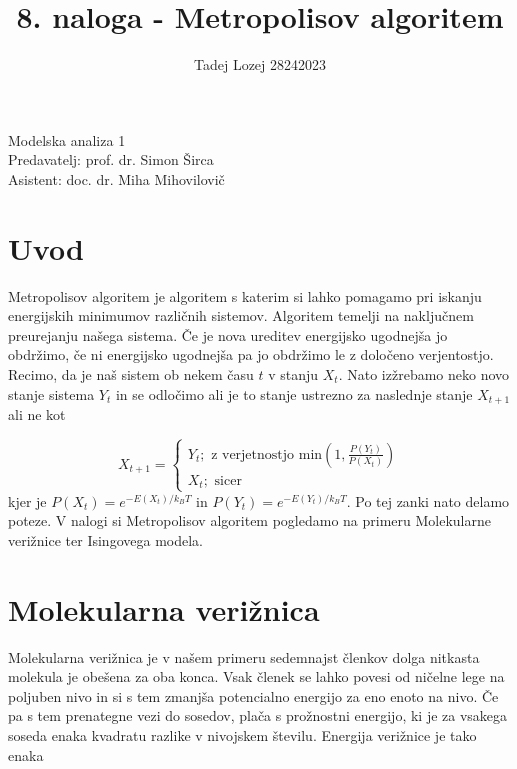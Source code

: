 \documentclass[slovene,11pt,a4paper]{article}
\begin{document}
\title{8. naloga - Metropolisov algoritem}
\author{Tadej Lozej 28242023}
\maketitle
\begin{center}
Modelska analiza 1 \\
\bigskip
Predavatelj: prof. dr. Simon Širca \\
Asistent: doc. dr. Miha Mihovilovič
\end{center}

\newpage

\tableofcontents

\newpage

\section{Uvod}


Metropolisov algoritem je algoritem s katerim si lahko pomagamo pri iskanju energijskih minimumov različnih sistemov. Algoritem temelji na naključnem preurejanju našega sistema. Če je nova ureditev energijsko ugodnejša jo obdržimo, če ni energijsko ugodnejša pa jo obdržimo le z določeno verjentostjo. Recimo, da je naš sistem ob nekem času $t$ v stanju $X_t$. Nato izžrebamo neko novo stanje sistema $Y_t$ in se odločimo ali je to stanje ustrezno za naslednje stanje $X_{t+1}$ ali ne kot

\begin{equation}
X_{t+1} = 
	\begin{cases}
	Y_t; \text{ z verjetnostjo } \text{min} \left(1, \frac{P(Y_t)}{P(X_t)} \right)\\
	X_t; \text{ sicer}
	\end{cases}
\end{equation}
kjer je $P(X_t) = e^{-E(X_t)/k_BT}$ in $P(Y_t) = e^{-E(Y_t)/k_BT}$. Po tej zanki nato delamo poteze. V nalogi si Metropolisov algoritem pogledamo na primeru Molekularne verižnice ter Isingovega modela.

\section{Molekularna verižnica}

Molekularna verižnica je v našem primeru sedemnajst členkov dolga nitkasta molekula je obešena za oba konca. Vsak členek se lahko povesi od ničelne lege na poljuben nivo in si s tem zmanjša potencialno energijo za eno enoto na nivo. Če pa s tem prenategne vezi do sosedov, plača s prožnostni energijo, ki je za vsakega soseda enaka kvadratu razlike v nivojskem številu. Energija verižnice je tako enaka
\end{document}
